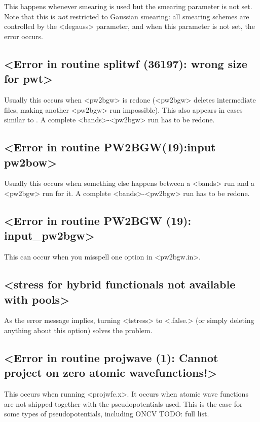 \documentclass[hyperref, a4paper, 12pt]{report}
\def\texttt#1{<#1>}%
\newcommand{\shortcode}[1]{\texttt{#1}}
\begin{document}
This happens whenever smearing is used 
but the smearing parameter is not set.
Note that this is \emph{not} restricted to Gaussian smearing:
all smearing schemes are controlled by the \shortcode{degauss} parameter, 
and when this parameter is not set, 
the error occurs.

\subsection{\shortcode{Error in routine  splitwf (36197): wrong size for pwt}}

Usually this occurs when \shortcode{pw2bgw} is redone
(\shortcode{pw2bgw} deletes intermediate files, 
making another \shortcode{pw2bgw} run impossible).
This also appears in cases similar to .
A complete \shortcode{bands}-\shortcode{pw2bgw} run has to be redone.

\subsection{\shortcode{Error in routine PW2BGW(19):input pw2bow}}

Usually this occurs when something else happens between a \shortcode{bands} run 
and a \shortcode{pw2bgw} run for it.
A complete \shortcode{bands}-\shortcode{pw2bgw} run has to be redone.

\subsection{\shortcode{Error in routine PW2BGW (19): input_pw2bgw}}

This can occur when you misspell one option in \shortcode{pw2bgw.in}.

\subsection{\shortcode{stress for hybrid functionals not available with pools}}

As the error message implies,  
turning \shortcode{tstress} to \shortcode{.false.} (or simply deleting anything about this option)
solves the problem.

\subsection{\shortcode{Error in routine projwave (1): Cannot project on zero atomic wavefunctions!}}

This occurs when running \shortcode{projwfc.x}. 
It occurs when atomic wave functions are not 
shipped together with the pseudopotentials used. 
This is the case for some types of pseudopotentials, 
including ONCV TODO: full list.
\end{document}
